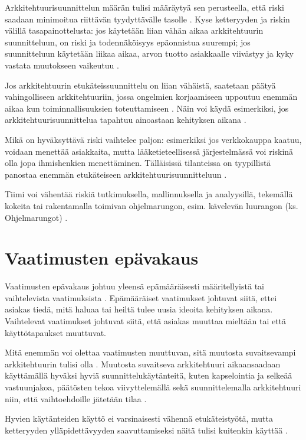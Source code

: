 Arkkitehtuurisuunnittelun määrän tulisi määräytyä sen perusteella, että riski saadaan minimoitua riittävän tyydyttävälle tasolle \citep{fairbanks2010just}. Kyse ketteryyden ja riskin välillä tasapainottelusta: jos käytetään liian vähän aikaa arkkitehtuurin suunnitteluun, on riski ja todennäköisyys epäonnistua suurempi; jos suunnitteluun käytetään liikaa aikaa, arvon tuotto asiakkaalle viivästyy ja kyky vastata muutokseen vaikeutuu \citep{waterman_how_2015}.

Jos arkkitehtuurin etukäteissuunnittelu on liian vähäistä, saatetaan päätyä vahingolliseen arkkitehtuuriin, jossa ongelmien korjaamiseen uppoutuu enemmän aikaa kun toiminnallisuuksien toteuttamiseen \citep{waterman_how_2015}. Näin voi käydä esimerkiksi, jos arkkitehtuurisuunnittelua tapahtuu ainoastaan kehityksen aikana \citep{eloranta2015techniques}.

Mikä on hyväksyttävä riski vaihtelee paljon: esimerkiksi jos verkkokauppa kaatuu, voidaan menettää asiakkaita, mutta lääketieteellisessä järjestelmässä voi riskinä olla jopa ihmishenkien menettäminen. Tälläisissä tilanteissa on tyypillistä panostaa enemmän etukäteiseen arkkitehtuurisuunnitteluun \citep{waterman_agility_2018_b}. 

Tiimi voi vähentää riskiä tutkimuksella, mallinnuksella ja analyysillä, tekemällä kokeita tai rakentamalla toimivan ohjelmarungon, esim. kävelevän luurangon (ks. Ohjelmarungot) \citep{waterman_how_2015}. 

\section{Vaatimusten epävakaus}
Vaatimusten epävakaus johtuu yleensä epämääräisesti määritellyistä tai vaihtelevista vaatimuksista \citep{waterman_how_2015}. Epämääräiset vaatimukset johtuvat siitä, ettei asiakas tiedä, mitä haluaa tai heiltä tulee uusia ideoita kehityksen aikana. Vaihtelevat vaatimukset johtuvat siitä, että asiakas muuttaa mieltään tai että käyttötapaukset muuttuvat.

Mitä enemmän voi olettaa vaatimusten muuttuvan, sitä muutosta suvaitsevampi arkkitehtuurin tulisi olla \citep{waterman_how_2015}. Muutosta suvaitseva arkkitehtuuri aikaansaadaan käyttämällä hyväksi hyviä suunnittelukäytänteitä, kuten kapselointia ja selkeää vastuunjakoa, päätösten tekoa viivyttelemällä sekä suunnittelemalla arkkitehtuuri niin, että vaihtoehdoille jätetään tilaa \citep{waterman_agility_2018_a}. 

Hyvien käytänteiden käyttö ei varsinaisesti vähennä etukäteistyötä, mutta ketteryyden ylläpidettävyyden saavuttamiseksi näitä tulisi kuitenkin käyttää \citep{waterman_agility_2018_a}. 

